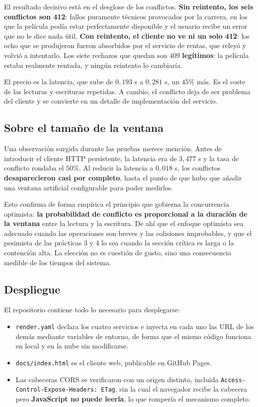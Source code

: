 \documentclass[12pt]{article}
\begin{document}
El resultado decisivo está en el desglose de los conflictos. \textbf{Sin reintento, los seis conflictos son 412}: fallos puramente técnicos provocados por la carrera, en los que la película podía estar perfectamente disponible y el usuario recibe un error que no le dice nada útil. \textbf{Con reintento, el cliente no ve ni un solo 412}: los ocho que se produjeron fueron absorbidos por el servicio de rentas, que releyó y volvió a intentarlo. Los siete rechazos que quedan son 409 \textbf{legítimos}: la película estaba realmente rentada, y ningún reintento lo cambiaría.

El precio es la latencia, que sube de $0{,}193$ s a $0{,}281$ s, un $45\%$ más. Es el coste de las lecturas y escrituras repetidas. A cambio, el conflicto deja de ser problema del cliente y se convierte en un detalle de implementación del servicio.

\subsection{Sobre el tamaño de la ventana}

Una observación surgida durante las pruebas merece mención. Antes de introducir el cliente HTTP persistente, la latencia era de $3{,}477$ s y la tasa de conflicto rondaba el $50\%$. Al reducir la latencia a $0{,}018$ s, los conflictos \textbf{desaparecieron casi por completo}, hasta el punto de que hubo que añadir una ventana artificial configurable para poder medirlos.

Esto confirma de forma empírica el principio que gobierna la concurrencia optimista: \textbf{la probabilidad de conflicto es proporcional a la duración de la ventana} entre la lectura y la escritura. De ahí que el enfoque optimista sea adecuado cuando las operaciones son breves y las colisiones improbables, y que el pesimista de las prácticas 3 y 4 lo sea cuando la sección crítica es larga o la contención alta. La elección no es cuestión de gusto, sino una consecuencia medible de los tiempos del sistema.

\subsection{Despliegue}

El repositorio contiene todo lo necesario para desplegarse:

\begin{itemize}[itemsep=2pt]
    \item \texttt{render.yaml} declara los cuatro servicios e inyecta en cada uno las URL de los demás mediante variables de entorno, de forma que el mismo código funciona en local y en la nube sin modificarse.
    \item \texttt{docs/index.html} es el cliente web, publicable en GitHub Pages.
    \item Las cabeceras CORS se verificaron con un origen distinto, incluida \texttt{Access-Control-Expose-Headers: ETag}, sin la cual el navegador recibe la cabecera pero \textbf{JavaScript no puede leerla}, lo que rompería el mecanismo completo.
\end{itemize}
\end{document}
